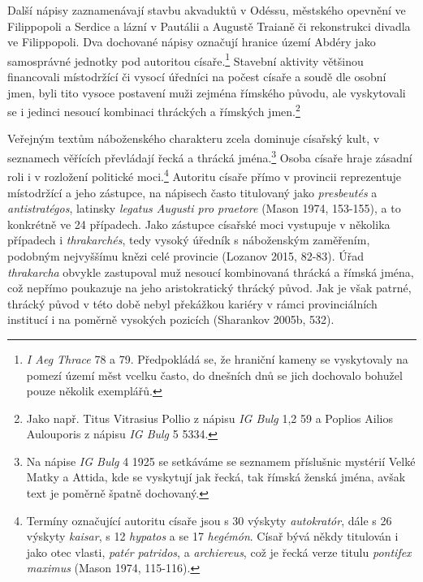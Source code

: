 Další nápisy zaznamenávají stavbu akvaduktů v Odéssu, městského opevnění ve Filippopoli a Serdice a lázní v Pautálii a Augustě Traianě či rekonstrukci divadla ve Filippopoli. Dva dochované nápisy označují hranice území Abdéry jako samosprávné jednotky pod autoritou císaře.\footnote{{\em I Aeg Thrace} 78 a 79. Předpokládá se, že hraniční kameny se vyskytovaly na pomezí území měst vcelku často, do dnešních dnů se jich dochovalo bohužel pouze několik exemplářů.} Stavební aktivity většinou financovali místodržící či vysocí úředníci na počest císaře a soudě dle osobní jmen, byli tito vysoce postavení muži zejména římského původu, ale vyskytovali se i jedinci nesoucí kombinaci thráckých a římských jmen.\footnote{Jako např. Titus Vitrasius Pollio z nápisu {\em IG Bulg} 1,2 59 a Poplios Ailios Aulouporis z nápisu {\em IG Bulg} 5 5334.}

Veřejným textům náboženského charakteru zcela dominuje císařský kult, v seznamech věřících převládají řecká a thrácká jména.\footnote{Na nápise {\em IG Bulg} 4 1925 se setkáváme se seznamem příslušnic mystérií Velké Matky a Attida, kde se vyskytují jak řecká, tak římská ženská jména, avšak text je poměrně špatně dochovaný.} Osoba císaře hraje zásadní roli i v rozložení politické moci.\footnote{Termíny označující autoritu císaře jsou s 30 výskyty {\em autokratór}, dále s 26 výskyty {\em kaisar}, s 12 {\em hypatos} a se 17 {\em hegémón}. Císař bývá někdy titulován i jako otec vlasti, {\em patér patridos}, a {\em archiereus}, což je řecká verze titulu {\em pontifex maximus} (Mason 1974, 115-116).} Autoritu císaře přímo v provincii reprezentuje místodržící a jeho zástupce, na nápisech často titulovaný jako {\em presbeutés} a {\em antistratégos}, latinsky {\em legatus Augusti pro praetore} (Mason 1974, 153-155), a to konkrétně ve 24 případech. Jako zástupce císařské moci vystupuje v několika případech i {\em thrakarchés}, tedy vysoký úředník s náboženským zaměřením, podobným nejvyššímu knězi celé provincie (Lozanov 2015, 82-83). Úřad {\em thrakarcha} obvykle zastupoval muž nesoucí kombinovaná thrácká a římská jména, což nepřímo poukazuje na jeho aristokratický thrácký původ. Jak je však patrné, thrácký původ v této době nebyl překážkou kariéry v rámci provinciálních institucí i na poměrně vysokých pozicích (Sharankov 2005b, 532).

